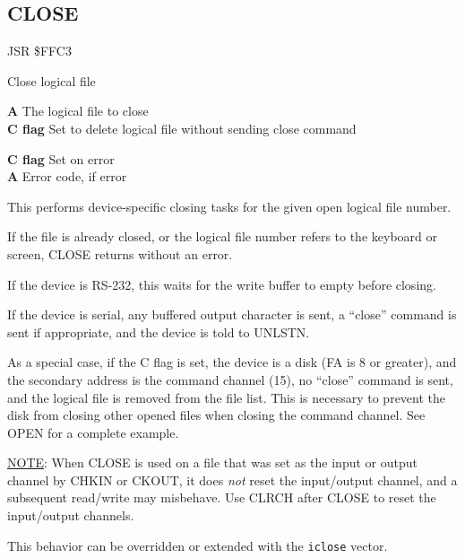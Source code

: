 \subsection{CLOSE}
\label{KERNAL Jump Table!CLOSE}
\begin{description}[leftmargin=2cm,style=nextline]
    \item [Address:] JSR \$FFC3
    \item [Description:] Close logical file
    \item [Inputs:]
        \textbf{A} The logical file to close \\
        \textbf{C flag} Set to delete logical file without sending close command
    \item [Outputs:]
        \textbf{C flag} Set on error \\
        \textbf{A} Error code, if error
    \item [Remarks:]
        This performs device-specific closing tasks for the given open logical file number.

        If the file is already closed, or the logical file number refers to the keyboard or screen, CLOSE returns without an error.

        If the device is RS-232, this waits for the write buffer to empty before closing.

        If the device is serial, any buffered output character is sent, a ``close'' command is sent if appropriate, and the device is told to UNLSTN.

        As a special case, if the C flag is set, the device is a disk (FA is 8 or greater), and the secondary address is the command channel (15), no ``close'' command is sent, and the logical file is removed from the file list. This is necessary to prevent the disk from closing other opened files when closing the command channel. See OPEN for a complete example.

        \underline{NOTE}: When CLOSE is used on a file that was set as the input or output channel by CHKIN or CKOUT, it does \emph{not} reset the input/output channel, and a subsequent read/write may misbehave. Use CLRCH after CLOSE to reset the input/output channels.

        This behavior can be overridden or extended with the \texttt{iclose} vector.
    \item [Example:]
\end{description}


